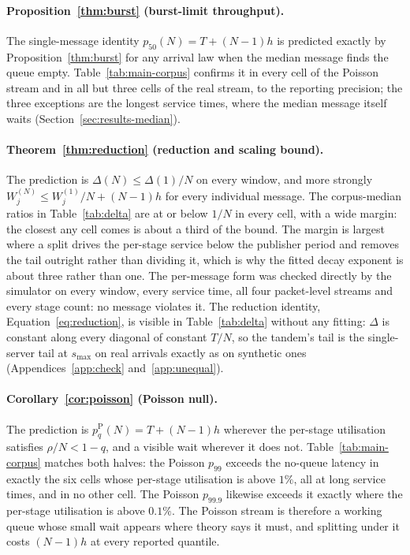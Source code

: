 \documentclass[11pt]{article}
\begin{document}
\paragraph{Proposition~\ref{thm:burst} (burst-limit throughput).} The single-message
identity $p_{50}(N) = T + (N-1) h$ is predicted exactly by Proposition~\ref{thm:burst} for
any arrival law when the median message finds the queue empty. Table~\ref{tab:main-corpus}
confirms it in every cell of the Poisson stream and in all but three cells of the real
stream, to the reporting precision; the three exceptions are the longest service times,
where the median message itself waits (Section~\ref{sec:results-median}).

\paragraph{Theorem~\ref{thm:reduction} (reduction and scaling bound).} The prediction is
$\Delta(N) \le \Delta(1)/N$ on every window, and more strongly $W_j^{(N)} \le W_j^{(1)}/N +
(N-1)h$ for every individual message. The corpus-median ratios in Table~\ref{tab:delta}
are at or below $1/N$ in every cell, with a wide margin: the closest any cell comes is about
a third of the bound. The margin is largest where a split drives the per-stage service
below the publisher period and removes the tail outright rather than dividing it, which is
why the fitted decay exponent is about three rather than one. The per-message form was
checked directly by the simulator on every window, every service time, all four
packet-level streams and every stage count: no message violates it. The reduction identity,
Equation~\eqref{eq:reduction}, is visible in Table~\ref{tab:delta} without any fitting:
$\Delta$ is constant along every diagonal of constant $T/N$, so the tandem's tail is the
single-server tail at $s_{\max}$ on real arrivals exactly as on synthetic ones
(Appendices~\ref{app:check} and~\ref{app:unequal}).

\paragraph{Corollary~\ref{cor:poisson} (Poisson null).} The prediction is
$p_{q}^{\mathrm{P}}(N) = T + (N-1)h$ wherever the per-stage utilisation satisfies
$\rho / N < 1 - q$, and a visible wait wherever it does not. Table~\ref{tab:main-corpus}
matches both halves: the Poisson $p_{99}$ exceeds the no-queue latency in exactly the six
cells whose per-stage utilisation is above $1\%$, all at long service times, and in no other
cell. The Poisson $p_{99.9}$ likewise exceeds it exactly where the per-stage utilisation is
above $0.1\%$. The Poisson stream is therefore a working queue whose small wait appears
where theory says it must, and splitting under it costs $(N-1)h$ at every reported
quantile.
\end{document}

